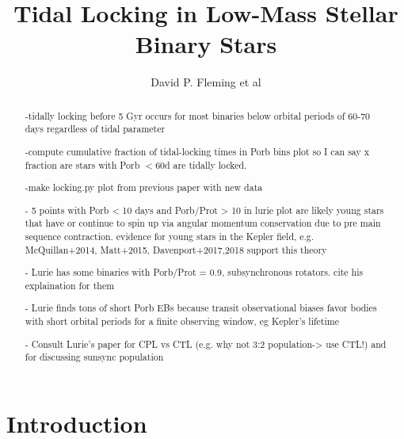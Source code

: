 \documentclass[twocolumn]{aastex61}
\begin{document}
\title{Tidal Locking in Low-Mass Stellar Binary Stars}



\author{David P. Fleming et al}


\begin{abstract}

-tidally locking before 5 Gyr occurs for most binaries below orbital periods of 60-70 days regardless of tidal parameter

-compute cumulative fraction of tidal-locking times in Porb bins plot so I can say x fraction are stars with Porb $< 60$d are tidally locked.

-make locking.py plot from previous paper with new data

- 5 points with Porb < 10 days and Porb/Prot > 10 in lurie plot are likely young stars that have or continue to spin up via angular momentum conservation due to pre main sequence contraction.  evidence for young stars in the Kepler field, e.g. McQuillan+2014, Matt+2015, Davenport+2017,2018 support this theory

- Lurie has some binaries with Porb/Prot = 0.9, subsynchronous rotators.  cite his explaination for them

- Lurie finds tons of short Porb EBs because transit observational biases favor bodies with short orbital periods for a finite observing window, eg Kepler's lifetime 

- Consult Lurie's paper for CPL vs CTL (e.g. why not 3:2 population-> use CTL!) and for discussing sunsync population

\end{abstract}




\section{Introduction} \label{sec:intro}
\end{document}
